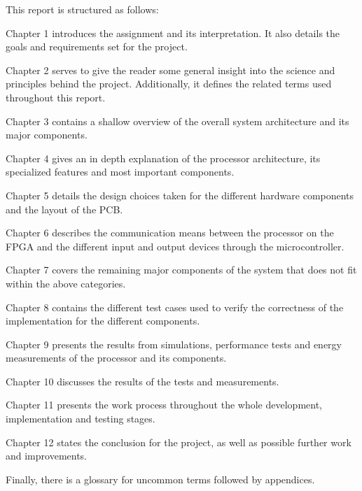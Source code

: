 This report is structured as follows:

Chapter 1 introduces the assignment and its interpretation. 
It also details the goals and requirements set for the project.

Chapter 2 serves to give the reader some general insight into the science and principles behind the project.
Additionally, it defines the related terms used throughout this report.

Chapter 3 contains a shallow overview of the overall system architecture and its major components.

Chapter 4 gives an in depth explanation of the processor architecture, its specialized features and most important components.

Chapter 5 details the design choices taken for the different hardware components and the layout of the PCB.

Chapter 6 describes the communication means between the processor on the FPGA and the different input and output devices through the microcontroller.

Chapter 7 covers the remaining major components of the system that does not fit within the above categories.

Chapter 8 contains the different test cases used to verify the correctness of the implementation for the different components.

Chapter 9 presents the results from simulations, performance tests and energy measurements of the processor and its components.

Chapter 10 discusses the results of the tests and measurements.

Chapter 11 presents the work process throughout the whole development, implementation and testing stages.

Chapter 12 states the conclusion for the project, as well as possible further work and improvements.

Finally, there is a glossary for uncommon terms followed by appendices.

